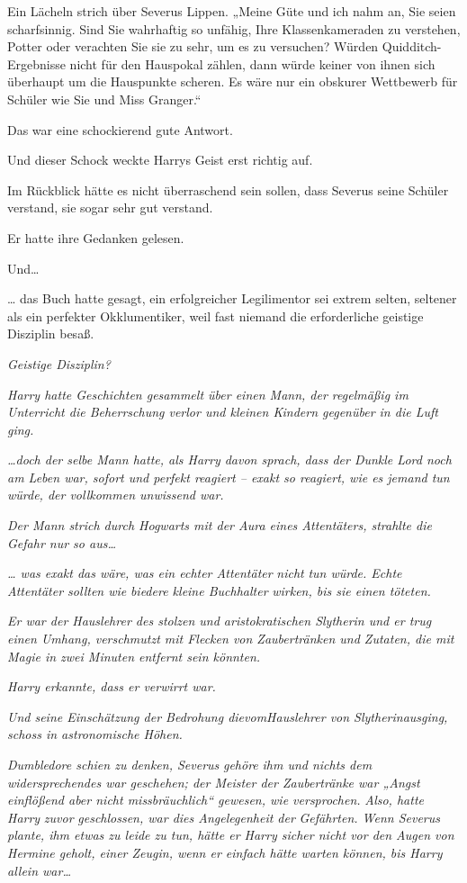 {Ein Lächeln strich über Severus Lippen. „Meine Güte und ich nahm an, Sie seien scharfsinnig. Sind Sie wahrhaftig so unfähig, Ihre Klassenkameraden zu verstehen, Potter oder verachten Sie sie zu sehr, um es zu versuchen? Würden Quidditch-Ergebnisse nicht für den Hauspokal zählen, dann würde keiner von ihnen sich überhaupt um die Hauspunkte scheren. Es wäre nur ein obskurer Wettbewerb für Schüler wie Sie und Miss Granger.“

Das war eine schockierend gute Antwort.

Und dieser Schock weckte Harrys Geist erst richtig auf.

Im Rückblick hätte es nicht überraschend sein sollen, dass Severus seine Schüler verstand, sie sogar sehr gut verstand.

Er hatte ihre Gedanken gelesen.

Und…

… das Buch hatte gesagt, ein erfolgreicher Legilimentor sei extrem selten, seltener als ein perfekter Okklumentiker, weil fast niemand die erforderliche geistige Disziplin besaß.

\emph{Geistige Disziplin?}

\emph{Harry hatte Geschichten gesammelt über einen Mann, der regelmäßig im Unterricht die Beherrschung verlor und kleinen Kindern gegenüber in die Luft ging.}

\emph{…doch der selbe Mann hatte, als Harry davon sprach, dass der Dunkle Lord noch am Leben war, sofort und perfekt reagiert -- exakt so reagiert, wie es jemand tun würde, der vollkommen unwissend war.}

\emph{Der Mann strich durch Hogwarts mit der Aura eines Attentäters, strahlte die Gefahr nur so aus…}

\emph{… was exakt das wäre, was ein echter Attentäter} \emph{\emph{nicht}} \emph{tun würde. Echte Attentäter sollten wie} \emph{biedere kleine Buchhalter} \emph{wirken, bis sie einen töteten.}

\emph{Er war der Hauslehrer des stolzen und aristokratischen Slytherin und er trug einen Umhang, verschmutzt mit Flecken von Zaubertränken und Zutaten, die mit Magie in zwei Minuten entfernt sein könnten.}

\emph{Harry erkannte, dass er verwirrt war.}

\emph{Und seine Einschätzung der Bedrohung dievom\emph{Hauslehrer von Slytherin}ausging,} \emph{schoss in astronomische Höhen.}

\emph{Dumbledore schien zu denken, Severus} \emph{gehöre} \emph{ihm und nichts dem widersprechendes war geschehen; der Meister der Zaubertränke war „Angst einflößend aber nicht missbräuchlich“ gewesen, wie versprochen.} \emph{Also, hatte Harry} \emph{zuvor} \emph{geschlossen, war dies Angelegenheit der} \emph{Gefährten. Wenn Severus plante, ihm etwas zu leide zu tun, hätte er Harry sicher nicht vor den Augen von Hermine geholt, einer Zeugin, wenn er einfach hätte warten können, bis Harry allein war…}

}
